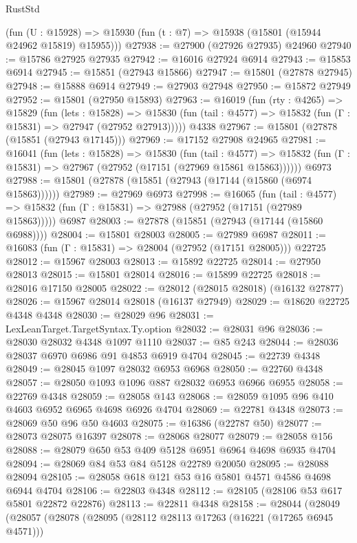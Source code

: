 \begin{lexlean}{RustStd}
\begin{coremodule}
    (fun (U : @15928) => @15930 (fun (t : @7) => @15938 (@15801 (@15944 @24962 @15819) @15955)))
@27938 := @27900 (@27926 @27935) @24960
@27940 := @15786 @27925 @27935
@27942 := @16016 @27924 @6914
@27943 := @15853 @6914
@27945 := @15851 (@27943 @15866)
@27947 := @15801 (@27878 @27945)
@27948 := @15888 @6914
@27949 := @27903 @27948
@27950 := @15872 @27949
@27952 := @15801 (@27950 @15893)
@27963 := @16019
    (fun (rty : @4265) =>
    @15829
      (fun (lets : @15828) =>
      @15830 (fun (tail : @4577) => @15832 (fun (Γ : @15831) => @27947 (@27952 @27913)))))
    @4338
@27967 := @15801 (@27878 (@15851 (@27943 @17145)))
@27969 := @17152 @27908 @24965
@27981 := @16041
    (fun (lets : @15828) =>
    @15830
      (fun (tail : @4577) =>
      @15832 (fun (Γ : @15831) => @27967 (@27952 (@17151 (@27969 @15861 @15863))))))
    @6973
@27988 := @15801 (@27878 (@15851 (@27943 (@17144 (@15860 (@6974 @15863))))))
@27989 := @27969 @6973
@27998 := @16065
    (fun (tail : @4577) => @15832 (fun (Γ : @15831) => @27988 (@27952 (@17151 (@27989 @15863)))))
    @6987
@28003 := @27878 (@15851 (@27943 (@17144 (@15860 @6988))))
@28004 := @15801 @28003
@28005 := @27989 @6987
@28011 := @16083 (fun (Γ : @15831) => @28004 (@27952 (@17151 @28005))) @22725
@28012 := @15967 @28003
@28013 := @15892 @22725
@28014 := @27950 @28013
@28015 := @15801 @28014
@28016 := @15899 @22725
@28018 := @28016 @17150 @28005
@28022 := @28012 (@28015 @28018) (@16132 @27877)
@28026 := @15967 @28014 @28018 (@16137 @27949)
@28029 := @18620 @22725 @4348 @4348
@28030 := @28029 @96
@28031 := LexLeanTarget.TargetSyntax.Ty.option
@28032 := @28031 @96
@28036 := @28030 @28032 @4348 @1097 @1110
@28037 := @85 @243
@28044 := @28036 @28037 @6970 @6986 @91 @4853 @6919 @4704
@28045 := @22739 @4348
@28049 := @28045 @1097 @28032 @6953 @6968
@28050 := @22760 @4348
@28057 := @28050 @1093 @1096 @887 @28032 @6953 @6966 @6955
@28058 := @22769 @4348
@28059 := @28058 @143
@28068 := @28059 @1095 @96 @410 @4603 @6952 @6965 @4698 @6926 @4704
@28069 := @22781 @4348
@28073 := @28069 @50 @96 @50 @4603
@28075 := @16386 (@22787 @50)
@28077 := @28073 @28075 @16397
@28078 := @28068 @28077
@28079 := @28058 @156
@28088 := @28079 @650 @53 @409 @5128 @6951 @6964 @4698 @6935 @4704
@28094 := @28069 @84 @53 @84 @5128 @22789 @20050
@28095 := @28088 @28094
@28105 := @28058 @618 @121 @53 @16 @5801 @4571 @4586 @4698 @6944 @4704
@28106 := @22803 @4348
@28112 := @28105 (@28106 @53 @617 @5801 @22872 @22876)
@28113 := @22811 @4348
@28158 := @28044
    (@28049
      (@28057
        (@28078
          (@28095
            (@28112 @28113 @17263 (@16221 (@17265 @6945 @4571)))

\end{coremodule}
\end{lexlean}
